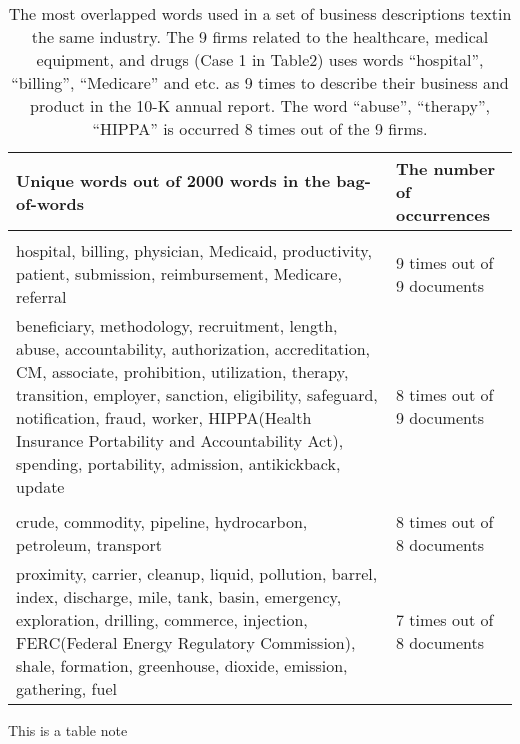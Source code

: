 \documentclass[11pt]{article}
\begin{document}

\clearpage
\begin{table}
\linespread{1.2}
\caption{The most overlapped words used in a set of business descriptions textin the same industry. The 9 firms related to the healthcare, medical equipment, and drugs (Case 1 in Table2) uses words ``hospital'', ``billing'', ``Medicare'' and etc. as 9 times to describe their business and product in the 10-K annual report. The word ``abuse'', ``therapy'', ``HIPPA'' is occurred 8 times out of the 9 firms.}
\centering
\fontsize{10}{13}\selectfont
\begin{threeparttable}
\begin{tabu} to 
\\
\toprule
Unique words out of 2000 words in the bag-of-words & The number of occurrences \\
\midrule
{}\\[2ex]
hospital, billing, physician, Medicaid, productivity, patient, submission, reimbursement, Medicare, referral & 9 times out of 9 documents \\[2.5ex]
beneficiary, methodology, recruitment, length, abuse, accountability, authorization, accreditation, CM, associate, prohibition, utilization, therapy, transition, employer, sanction, eligibility, safeguard, notification, fraud, worker, HIPPA(Health Insurance Portability and Accountability Act), spending, portability, admission, antikickback, update & 8 times out of 9 documents \\[2ex]

\midrule
{}\\[2ex]
crude, commodity, pipeline, hydrocarbon, petroleum, transport & 8 times out of 8 documents \\[1.5ex]
proximity, carrier, cleanup, liquid, pollution, barrel, index, discharge, mile, tank, basin, emergency, exploration, drilling, commerce, injection, FERC(Federal Energy Regulatory Commission), shale, formation, greenhouse, dioxide, emission, gathering, fuel & 7 times out of 8 documents \\[1ex]



\bottomrule
\end{tabu}
\begin{tablenotes}[flushleft]
\linespread{1.3}\footnotesize
\item This is a table note
\end{tablenotes}
\end{threeparttable}
\end{table}
\end{document}
